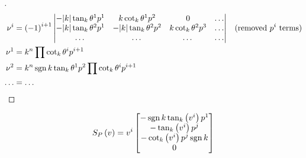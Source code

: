 \documentclass[stu, babel, american, biblatex, a4paper, leqno, draftall]{apa7}
\begin{document}
\begin{proof}[]
\begin{align*}
        \tensor{\nu}{^i}
                    & = \left(-1\right)^{i+1}
        \left\vert
        \begin{matrix}
            -\abs{k}\tan_k{\tensor{\theta}{^1}}\tensor{p}{^1} & k\cot_k{\tensor{\theta}{^1}}\tensor{p}{^2}        & 0                                          & \dots \\
            -\abs{k}\tan_k{\tensor{\theta}{^2}}\tensor{p}{^1} & -\abs{k}\tan_k{\tensor{\theta}{^2}}\tensor{p}{^2} & k\cot_k{\tensor{\theta}{^2}}\tensor{p}{^3} & \dots \\
            \dots                                             & \dots                                             & \dots                                      & \dots \\
        \end{matrix}
        \right\vert & \text{(removed $\tensor{p}{^i}$ terms)}                                                                                                       \\
        \tensor{\nu}{^1}
                    & = k^n \prod{\cot_k{\tensor{\theta}{^i}}\tensor{p}{^{i+1}}}                                                                                    \\
        \tensor{\nu}{^2}
                    & = k^n \sign{k} \tan_k{\tensor{\theta}{^1}}\tensor{p}{^2}\prod{\cot_k{\tensor{\theta}{^i}}\tensor{p}{^{i+1}}}                                  \\
        \dots       & = \dots
    \end{align*}
\end{proof}
\begin{lemma}\label{Model:ShapeOperator}
    \begin{equation*}
        S_{P}\left(v\right)
        = \tensor{v}{^i} \begin{bmatrix}
            -\sign{k}\tan_k\left(\tensor{v}{^i}\right)\tensor{p}{^1} \\
            -\tan_k\left(\tensor{v}{^i}\right)\tensor{p}{^j}         \\
            -\cot_k\left(\tensor{v}{^i}\right)\tensor{p}{^j}\sign{k} \\
            0                                                        \\
        \end{bmatrix}
    \end{equation*}
\end{lemma}
\end{document}
